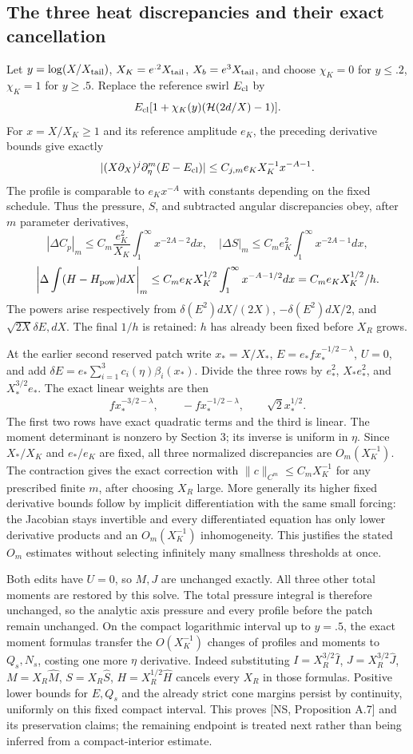 \documentclass[10pt,a4paper]{article}
\newcommand{\hh}{\mathcal H}
\begin{document}
\subsection{The three heat discrepancies and their exact cancellation}
Let $y=\log(X/X_{\rm tail})$, $X_K=e^{.2}X_{\rm tail}$,
$X_b=e^3X_{\rm tail}$, and choose $\chi_K=0$ for $y\le.2$, $\chi_K=1$
for $y\ge.5$. Replace the reference swirl $E_{\rm cl}$ by
\[
E_{\rm cl}[1+\chi_K(y)(\hh(2d/X)-1)].
\]
For $x=X/X_K\ge1$ and its reference amplitude $e_K$, the preceding
derivative bounds give exactly
\[
|(X\partial_X)^j\partial_\eta^m(E-E_{\rm cl})|
\le C_{j,m}e_KX_K^{-1}x^{-A-1}.
\]
The profile is comparable to $e_Kx^{-A}$ with constants depending on the
fixed schedule. Thus the pressure, $S$, and subtracted angular discrepancies
obey, after $m$ parameter derivatives,
\[
|\Delta C_p|_m\le C_m\frac{e_K^2}{X_K}\int_1^\infty x^{-2A-2}dx,
\quad |\Delta S|_m\le C_me_K^2\int_1^\infty x^{-2A-1}dx,
\]
\[
\left|\Delta\int(H-H_{\rm pow})dX\right|_m
\le C_me_KX_K^{1/2}\int_1^\infty x^{-A-1/2}dx
=C_m e_KX_K^{1/2}/h.
\]
The powers arise respectively from $\delta(E^2)dX/(2X)$,
$-\delta(E^2)dX/2$, and $\sqrt{2X}\delta E,dX$.
The final $1/h$ is retained: $h$ has already been fixed before $X_R$ grows.

At the earlier second reserved patch write $x_*=X/X_*$,
$E=e_*f x_*^{-1/2-\lambda}$, $U=0$, and add
$\delta E=e_*\sum_{i=1}^3 c_i(\eta)\beta_i(x_*)$.
Divide the three rows by $e_*^2$, $X_*e_*^2$, and $X_*^{3/2}e_*$.
The exact linear weights are then
\[
f x_*^{-3/2-\lambda},\qquad -f x_*^{-1/2-\lambda},\qquad
\sqrt2 x_*^{1/2}.
\]
The first two rows have exact quadratic terms and the third is linear.
The moment determinant is nonzero by Section 3; its inverse is uniform in
$\eta$. Since $X_*/X_K$ and $e_*/e_K$ are fixed, all three normalized
discrepancies are $O_m(X_K^{-1})$. The contraction gives the exact correction
with $\|c\|_{C^m}\le C_mX_K^{-1}$ for any prescribed finite $m$, after
choosing $X_R$ large. More generally its higher fixed derivative bounds follow
by implicit differentiation with the same small forcing: the Jacobian stays
invertible and every differentiated equation has only lower derivative products
and an $O_m(X_K^{-1})$ inhomogeneity. This justifies the stated $O_m$ estimates
without selecting infinitely many smallness thresholds at once.

Both edits have $U=0$, so $M,J$ are unchanged exactly. All three other total
moments are restored by this solve. The total pressure integral is therefore
unchanged, so the analytic axis pressure and every profile before the patch
remain unchanged. On the compact logarithmic interval up to $y=.5$,
the exact moment formulas transfer the $O(X_K^{-1})$ changes of profiles and
moments to $Q_s,N_s$, costing one more $\eta$ derivative.
Indeed substituting $I=X_R^{3/2}\widehat I$, $J=X_R^{3/2}\widehat J$,
$M=X_R\widehat M$, $S=X_R\widehat S$, $H=X_R^{1/2}\widehat H$
cancels every $X_R$ in those formulas. Positive lower bounds for $E,Q_s$
and the already strict cone margins persist by continuity, uniformly on this
fixed compact interval. This proves [NS, Proposition A.7] and its preservation
claims; the remaining endpoint is treated next rather than being inferred
from a compact-interior estimate.
\end{document}
